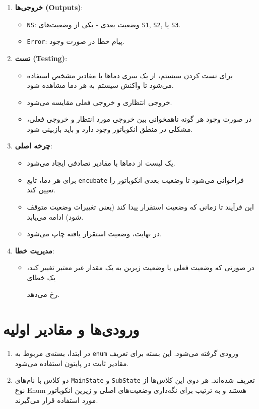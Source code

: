 \begin{enumerate}
	\item \textbf{خروجی‌ها (Outputs)}:
	\begin{itemize}
		\item \texttt{NS}: وضعیت بعدی - یکی از وضعیت‌های \texttt{S1}, \texttt{S2}, یا \texttt{S3}.
		\item \texttt{Error}: پیام خطا در صورت وجود.
	\end{itemize}
	
	\item \textbf{تست (Testing)}:
	\begin{itemize}
		\item برای تست کردن سیستم، از یک سری دماها با مقادیر مشخص استفاده می‌شود تا واکنش سیستم به هر دما مشاهده شود.
		\item خروجی انتظاری و خروجی فعلی مقایسه می‌شود.
		\item در صورت وجود هر گونه ناهمخوانی بین خروجی مورد انتظار و خروجی فعلی، مشکلی در منطق انکوباتور وجود دارد و باید بازبینی شود.
	\end{itemize}
	
	\item \textbf{چرخه اصلی}:
	\begin{itemize}
		\item یک لیست از دماها با مقادیر تصادفی ایجاد می‌شود.
		\item برای هر دما، تابع \texttt{encubate} فراخوانی می‌شود تا وضعیت بعدی انکوباتور را تعیین کند.
		\item این فرآیند تا زمانی که وضعیت استقرار پیدا کند (یعنی تغییرات وضعیت متوقف شود) ادامه می‌یابد.
		\item در نهایت، وضعیت استقرار یافته چاپ می‌شود.
	\end{itemize}
	
	\item \textbf{مدیریت خطا}:
	\begin{itemize}
		\item در صورتی که وضعیت فعلی یا وضعیت زیرین به یک مقدار غیر معتبر تغییر کند، یک خطای
		
		  رخ می‌دهد.
	\end{itemize}
\end{enumerate}

\section*{ورودی‌ها و مقادیر اولیه}

\begin{enumerate}
	\item در ابتدا، بسته‌ی مربوط به \texttt{enum} ورودی گرفته می‌شود. این بسته برای تعریف مقادیر ثابت در پایتون استفاده می‌شود.
	\item دو کلاس با نام‌های \texttt{MainState} و \texttt{SubState} تعریف شده‌اند. هر دوی این کلاس‌ها از نوع Enum هستند و به ترتیب برای نگه‌داری وضعیت‌های اصلی و زیرین انکوباتور مورد استفاده قرار می‌گیرند.
\end{enumerate}

